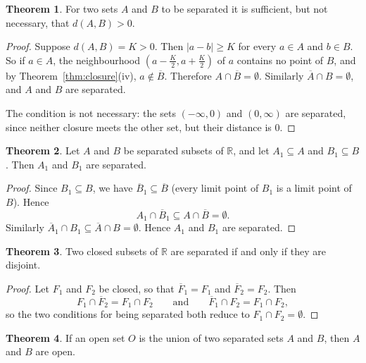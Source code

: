 \documentclass[11pt,a4paper]{article}
\numberwithin{equation}{section}
\theoremstyle{definition}
\newtheorem{thm}{Theorem}[subsection]
\begin{document}
\begin{thm}
For two sets $A$ and $B$ to be separated it is sufficient, but not necessary, that $d(A,B)>0$.
\end{thm}

\begin{proof}
Suppose $d(A,B) = K > 0$. Then $| a - b| \geq K$ for every $a\in A$ and $b\in B$. So if $a\in A$, the neighbourhood $\left(a - \frac{K}{2}, a + \frac{K}{2}\right)$ of $a$ contains no point of $B$, and by Theorem~\ref{thm:closure}(iv), $a\notin\overline{B}$. Therefore $A \cap \overline{B} = \emptyset$. Similarly $\overline{A} \cap B = \emptyset$, and $A$ and $B$ are separated.

The condition is not necessary: the sets $(-\infty,0)$ and $(0,\infty)$ are separated, since neither closure meets the other set, but their distance is $0$.
\end{proof}


\begin{thm}
Let $A$ and $B$ be separated subsets of $\mathbb{R}$, and let $A_1\subseteq A$ and $B_1\subseteq B$. Then $A_1$ and $B_1$ are separated.
\end{thm}

\begin{proof}
Since $B_1\subseteq B$, we have $\overline{B}_1 \subseteq \overline{B}$ (every limit point of $B_1$ is a limit point of $B$). Hence
$$A_1 \cap \overline{B}_1 \subseteq A \cap \overline{B} = \emptyset .$$
Similarly $\overline{A}_1 \cap B_1 \subseteq \overline{A}\cap B = \emptyset$. Hence $A_1$ and $B_1$ are separated.
\end{proof}


\begin{thm}
Two closed subsets of $\mathbb{R}$ are separated if and only if they are disjoint.
\end{thm}

\begin{proof}
Let $F_1$ and $F_2$ be closed, so that $\overline{F}_1 = F_1$ and $\overline{F}_2 = F_2$. Then
$$F_1\cap \overline{F}_2 = F_1\cap F_2 \qquad\text{and}\qquad \overline{F}_1\cap F_2 = F_1\cap F_2 ,$$
so the two conditions for being separated both reduce to $F_1\cap F_2 = \emptyset$.
\end{proof}


\begin{thm}
If an open set $O$ is the union of two separated sets $A$ and $B$, then $A$ and $B$ are open.
\end{thm}
\end{document}
